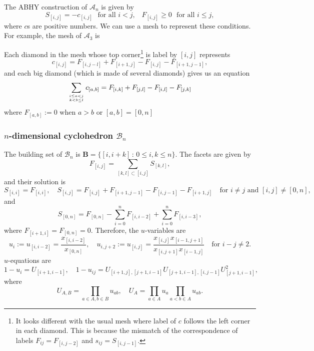 \documentclass[hidelinks,12pt]{article}
\begin{document}
The ABHY construction of $\mathscr A_n$ is given by 
\[
	S_{[i,j]}=-c_{[i,j]} \,\,\text{ for all $i<j$,}\quad
	F_{[i,j]}\geq 0 \,\,\text{ for all $i\leq j$},
\]
where $c$s are positive numbers. We can use a mesh to represent these conditions.
For example, the mesh of $\mathscr A_3$ is 
\begin{center}
\end{center}
Each diamond in the mesh whose top corner\footnote{
It looks different with the usual mesh where label of $c$ follows the left corner
in each diamond. This is because the mismatch of the correspondence of labels 
$F_{ij}=F_{[i,j-2]}$ and $s_{ij}=S_{[i,j-1]}$.
}
is label by $[i,j]$ represents 
\[
	c_{[i,j]}=F_{[i,j-l]}+F_{[i+1,j]}-F_{[i,j]}-F_{[i+1,j-1]},
\]
and each big diamond (which is made of several diamonds) gives us an equation
\[
	\sum_{i\leq a<j\atop{k<b\leq l}} c_{[a,b]} = 
	F_{[i,k]}+F_{[j,l]}-F_{[i,l]}-F_{[j,k]}
\]
where $F_{[a,b]}:=0$ when $a>b$ or $[a,b]=[0,n]$

\subsubsection*{$n$-dimensional cyclohedron $\mathscr B_n$}

The building set of $\mathscr B_n$ is $\mathbf B=\{[i,i+k]\,:\,0\leq i, k\leq n\}$.
The facets are given by 
\[
F_{[i,j]}=\sum_{[k,l]\subset [i,j]}S_{[k,l]},
\]
and their solution is 
\[
	S_{[i,i]}=F_{[i,i]},\quad S_{[i,j]}=F_{[i,j]}+F_{[i+1,j-1]}-F_{[i,j-1]}-F_{[i+1,j]}\quad \text{for $i\neq j$ and $[i,j]\neq [0,n]$},
\]
and
\[
	S_{[0,n]}=F_{[0,n]}-\sum_{i=0}^n F_{[i,i-2]} +\sum_{i=0}^n F_{[i,i-3]},
\]
where $F_{[i+1,i]}=F_{[0,n]}=0$. Therefore, the $u$-variables are
\[
u_i:=u_{[i,i-2]}=\frac{x_{[i,i-2]}}{x_{[0,n]}},\quad 
u_{i,j+2}:=u_{[i,j]}=\frac{x_{[i,j]}x_{[i-1,j+1]}}{x_{[i,j+1]}x_{[i-1,j]}}
\quad \text{for $i-j\neq 2$}.
\]
$u$-equations are
\[
1-u_i=U_{[i+1,i-1]},\quad 
1-u_{ij}=U_{[i+1,j],[j+1,i-1]}U_{[j+1,i-1],[i,j-1]}U^2_{[j+1,i-1]},
\]
where 
\[
U_{A,B}=\prod_{a\in A,b\in B}u_{ab},\quad 
U_A=\prod_{a\in A}u_a\prod_{a<b\in A}u_{ab}.
\]
\end{document}
